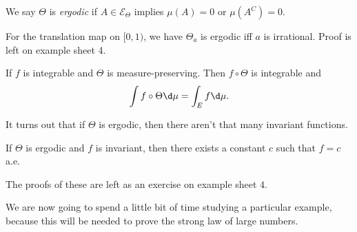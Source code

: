 \documentclass[a4paper]{article}
\begin{document}
\begin{defi}[Ergodic]
  We say $\Theta$ is \emph{ergodic} if $A \in \mathcal{E}_\Theta$ implies $\mu(A) = 0$ or $\mu(A^C) = 0$.
\end{defi}

\begin{eg}
  For the translation map on $[0, 1)$, we have $\Theta_a$ is ergodic iff $a$ is irrational. Proof is left on example sheet 4.
\end{eg}

\begin{prop}
  If $f$ is integrable and $\Theta$ is measure-preserving. Then $f \circ \Theta$ is integrable and
  \[
    \int f \circ \Theta \d \mu = \int_E f \d \mu.
  \]
\end{prop}

It turns out that if $\Theta$ is ergodic, then there aren't that many invariant functions.
\begin{prop}
  If $\Theta$ is ergodic and $f$ is invariant, then there exists a constant $c$ such that $f = c$ a.e.
\end{prop}
The proofs of these are left as an exercise on example sheet $4$.

We are now going to spend a little bit of time studying a particular example, because this will be needed to prove the strong law of large numbers.
\end{document}
